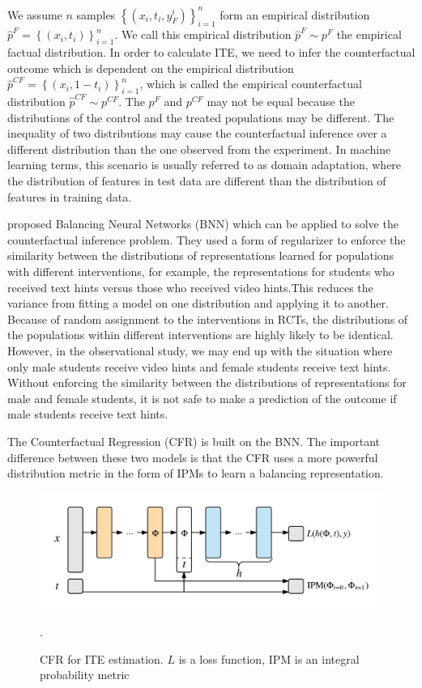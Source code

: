 \documentclass{article}
\begin{document}
We assume $n$ samples $\left \{ (x_i, t_i, y_F^i) \right \}_{i=1}^n$
form an empirical distribution $\hat{p}^F  = \left \{ (x_i, t_i)
\right \}_{i=1}^n$. We call this empirical distribution $\hat{p}^F
\sim p^F$ the empirical factual distribution. In order to calculate
ITE, we need to infer the counterfactual outcome which is dependent on
the empirical distribution $\hat{p}^{CF}  = \left \{ (x_i, 1-t_i)
\right \}_{i=1}^n$, which is called the empirical counterfactual distribution $\hat{p}^{CF}
\sim p^{CF}$. The $p^{F}$ and $p^{CF}$ may not be equal because the
distributions of the control and the treated populations may be
different. The inequality of two distributions may cause the
counterfactual inference over a different distribution than the one
observed from the experiment. In machine learning terms, this scenario
is usually referred to as domain adaptation, where the distribution of
features in test data are different than the distribution of features
in training data.

\cite{Johansson2016-dh} proposed Balancing Neural Networks (BNN) which
can be applied to solve the counterfactual inference problem. They
used a form of regularizer to enforce the similarity between the
distributions of representations learned for populations with
different interventions, for example, the representations for students
who received text hints versus those who received video hints.This
reduces the variance from fitting a model on one distribution and
applying it to another. Because of random assignment to the
interventions in RCTs, the distributions of the populations within
different interventions are highly likely to be identical. However, in
the observational study, we may end up with the situation where only
male students receive video hints and female students receive text
hints. Without enforcing the similarity between the distributions of
representations for male and female students, it is not safe to make a
prediction of the outcome if male students receive text hints.

The Counterfactual Regression (CFR) \cite{Shalit2016-qk} is built on the BNN. The important difference between these two models is that the CFR uses a more powerful distribution metric in the form of IPMs to learn a balancing representation.

\begin{figure}[h]
  \centering
  \includegraphics[width=0.95\columnwidth]{cfr.png}
  \caption{CFR for ITE estimation. $L$ is a loss function, IPM is an integral probability metric}.
  ~\label{fg:cfr-model}
\end{figure}
\end{document}
